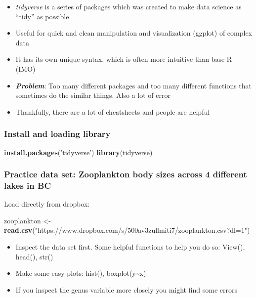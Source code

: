 \documentclass[]{article}
\newenvironment{Shaded}{\begin{snugshade}}{\end{snugshade}}
\newcommand{\KeywordTok}[1]{\textcolor[rgb]{0.13,0.29,0.53}{\textbf{{#1}}}}
\newcommand{\StringTok}[1]{\textcolor[rgb]{0.31,0.60,0.02}{{#1}}}
\newcommand{\NormalTok}[1]{{#1}}
\providecommand{\tightlist}{%
  \setlength{\itemsep}{0pt}\setlength{\parskip}{0pt}}
\begin{document}
\begin{itemize}
\tightlist
\item
  \emph{tidyverse} is a series of packages which was created to make
  data science as ``tidy'' as possible
\item
  Useful for quick and clean manipulation and visualization (ggplot) of
  complex data
\item
  It has its own unique syntax, which is often more intuitive than base
  R (IMO)
\item
  \textbf{\emph{Problem}}: Too many different packages and too many
  different functions that sometimes do the similar things. Also a lot
  of error
\item
  Thankfully, there are a lot of cheatsheets and people are helpful
\end{itemize}

\subsubsection{Install and loading
library}\label{install-and-loading-library}

\begin{Shaded}
\begin{Highlighting}[]
\KeywordTok{install.packages}\NormalTok{(}\StringTok{'tidyverse'}\NormalTok{)}
\KeywordTok{library}\NormalTok{(tidyverse)}
\end{Highlighting}
\end{Shaded}

\subsubsection{Practice data set: Zooplankton body sizes across 4
different lakes in
BC}\label{practice-data-set-zooplankton-body-sizes-across-4-different-lakes-in-bc}

Load directly from dropbox:

\begin{Shaded}
\begin{Highlighting}[]
\NormalTok{zooplankton <-}\StringTok{ }\KeywordTok{read.csv}\NormalTok{(}\StringTok{"https://www.dropbox.com/s/500av3zullmiti7/zooplankton.csv?dl=1"}\NormalTok{)}
\end{Highlighting}
\end{Shaded}

\begin{itemize}
\tightlist
\item
  Inspect the data set first. Some helpful functions to help you do so:
  View(), head(), str()
\item
  Make some easy plots: hist(), boxplot(y\textasciitilde{}x)
\item
  If you inspect the genus variable more closely you might find some
  errors
\end{itemize}
\end{document}

